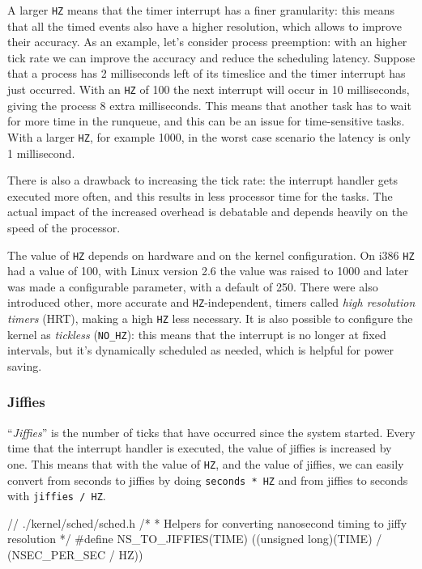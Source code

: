 A larger \texttt{HZ} means that the timer interrupt has a finer granularity: this means that all the timed events also have a higher resolution, which allows to improve their accuracy. As an example, let's consider process preemption: with an higher tick rate we can improve the accuracy and reduce the scheduling latency. Suppose that a process has 2 milliseconds left of its timeslice and the timer interrupt has just occurred. With an \texttt{HZ} of 100 the next interrupt will occur in 10 milliseconds, giving the process 8 extra milliseconds. This means that another task has to wait for more time in the runqueue, and this can be an issue for time-sensitive tasks. With a larger \texttt{HZ}, for example 1000, in the worst case scenario the latency is only 1 millisecond.

There is also a drawback to increasing the tick rate: the interrupt handler gets executed more often, and this results in less processor time for the tasks. The actual impact of the increased overhead is debatable and depends heavily on the speed of the processor.

The value of \texttt{HZ} depends on hardware and on the kernel configuration. On i386 \texttt{HZ} had a value of 100, with Linux version 2.6 the value was raised to 1000 and later was made a configurable parameter, with a default of 250. There were also introduced other, more accurate and \texttt{HZ}-independent, timers called \textit{high resolution timers} (HRT), making a high \texttt{HZ} less necessary. It is also possible to configure the kernel as \textit{tickless} (\verb|NO_HZ|): this means that the interrupt is no longer at fixed intervals, but it's dynamically scheduled as needed, which is helpful for power saving.

\subsubsection{Jiffies}
``\textit{Jiffies}'' is the number of ticks that have occurred since the system started. Every time that the interrupt handler is executed, the value of jiffies is increased by one. This means that with the value of \texttt{HZ}, and the value of jiffies, we can easily convert from seconds to jiffies by doing \verb|seconds * HZ| and from jiffies to seconds with \verb|jiffies / HZ|.
\begin{code}
// ./kernel/sched/sched.h
/*
 * Helpers for converting nanosecond timing to jiffy resolution
 */
#define NS_TO_JIFFIES(TIME) ((unsigned long)(TIME) / (NSEC_PER_SEC / HZ))
\end{code}

